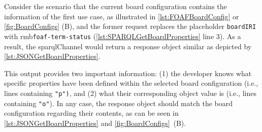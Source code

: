 \noindent Consider the scenario that the current board configuration contains the information of the first use case, as illustrated in \autoref{lst:FOAFBoardConfig} or \autoref{fig:BoardConfigs} (B), and the former request replaces the placeholder \texttt{boardIRI} with \acrshort{rmb}\texttt{foaf-term-status} (\autoref{lst:SPARQLGetBoardProperties} line 3). As a result, the sparqlChannel would return a response object similar as depicted by \autoref{lst:JSONGetBoardProperties}.

This output provides two important information: (1) the developer knows what specific properties have been defined within the selected board configuration (i.e., lines containing \texttt{"p")}, and (2) what their corresponding object value is (i.e., lines containing \texttt{"o"}). In any case, the response object should match the board configuration regarding their contents, as can be seen in \autoref{lst:JSONGetBoardProperties} and \autoref{fig:BoardConfigs}~(B).




